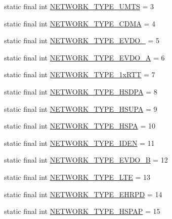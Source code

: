 \begin{DoxyCompactItemize}
\item 
static final int \hyperlink{interfacecom_1_1qualoutdoor_1_1recorder_1_1telephony_1_1ITelephony_a8135b29f493e56a852c6938f094e370c}{N\-E\-T\-W\-O\-R\-K\-\_\-\-T\-Y\-P\-E\-\_\-\-U\-M\-T\-S} = 3
\item 
static final int \hyperlink{interfacecom_1_1qualoutdoor_1_1recorder_1_1telephony_1_1ITelephony_a8242847ab2e7f8cd3b9a4ca0af7789aa}{N\-E\-T\-W\-O\-R\-K\-\_\-\-T\-Y\-P\-E\-\_\-\-C\-D\-M\-A} = 4
\item 
static final int \hyperlink{interfacecom_1_1qualoutdoor_1_1recorder_1_1telephony_1_1ITelephony_a17d25ab25bf982026aa45b3f4d29ceb5}{N\-E\-T\-W\-O\-R\-K\-\_\-\-T\-Y\-P\-E\-\_\-\-E\-V\-D\-O\-\_} = 5
\item 
static final int \hyperlink{interfacecom_1_1qualoutdoor_1_1recorder_1_1telephony_1_1ITelephony_a9ea0965450da41c68810e4e071b2230e}{N\-E\-T\-W\-O\-R\-K\-\_\-\-T\-Y\-P\-E\-\_\-\-E\-V\-D\-O\-\_\-\-A} = 6
\item 
static final int \hyperlink{interfacecom_1_1qualoutdoor_1_1recorder_1_1telephony_1_1ITelephony_a4203966c4736f3023fc7940671f058d0}{N\-E\-T\-W\-O\-R\-K\-\_\-\-T\-Y\-P\-E\-\_\-1x\-R\-T\-T} = 7
\item 
static final int \hyperlink{interfacecom_1_1qualoutdoor_1_1recorder_1_1telephony_1_1ITelephony_af03c317a10fcccd01008912fa27b8f25}{N\-E\-T\-W\-O\-R\-K\-\_\-\-T\-Y\-P\-E\-\_\-\-H\-S\-D\-P\-A} = 8
\item 
static final int \hyperlink{interfacecom_1_1qualoutdoor_1_1recorder_1_1telephony_1_1ITelephony_a8508ef692db2bba21961b1e213b3440d}{N\-E\-T\-W\-O\-R\-K\-\_\-\-T\-Y\-P\-E\-\_\-\-H\-S\-U\-P\-A} = 9
\item 
static final int \hyperlink{interfacecom_1_1qualoutdoor_1_1recorder_1_1telephony_1_1ITelephony_a90ea3934af7570fac6e9c4787b130d2a}{N\-E\-T\-W\-O\-R\-K\-\_\-\-T\-Y\-P\-E\-\_\-\-H\-S\-P\-A} = 10
\item 
static final int \hyperlink{interfacecom_1_1qualoutdoor_1_1recorder_1_1telephony_1_1ITelephony_ad7af57643bf08eb193e93557d4c40e53}{N\-E\-T\-W\-O\-R\-K\-\_\-\-T\-Y\-P\-E\-\_\-\-I\-D\-E\-N} = 11
\item 
static final int \hyperlink{interfacecom_1_1qualoutdoor_1_1recorder_1_1telephony_1_1ITelephony_a9c5eee3774b26ae94b26fa7a41dfe75e}{N\-E\-T\-W\-O\-R\-K\-\_\-\-T\-Y\-P\-E\-\_\-\-E\-V\-D\-O\-\_\-\-B} = 12
\item 
static final int \hyperlink{interfacecom_1_1qualoutdoor_1_1recorder_1_1telephony_1_1ITelephony_a79e0b4ed8ec3eb9a708f37fd7e9a6316}{N\-E\-T\-W\-O\-R\-K\-\_\-\-T\-Y\-P\-E\-\_\-\-L\-T\-E} = 13
\item 
static final int \hyperlink{interfacecom_1_1qualoutdoor_1_1recorder_1_1telephony_1_1ITelephony_aa6753bbf9b85da56a2319aee7de45cc4}{N\-E\-T\-W\-O\-R\-K\-\_\-\-T\-Y\-P\-E\-\_\-\-E\-H\-R\-P\-D} = 14
\item 
static final int \hyperlink{interfacecom_1_1qualoutdoor_1_1recorder_1_1telephony_1_1ITelephony_a1fac9f01efb238a6de1a6a7a5fccd304}{N\-E\-T\-W\-O\-R\-K\-\_\-\-T\-Y\-P\-E\-\_\-\-H\-S\-P\-A\-P} = 15
\end{DoxyCompactItemize}



